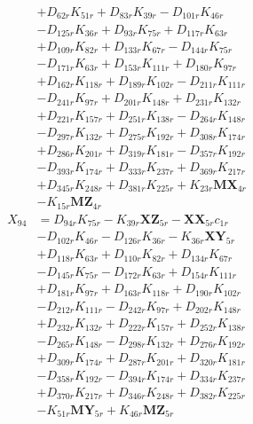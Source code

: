\begin{multicols}{2}
\begin{align}
&+ D_{62r}K_{51r} + D_{83r}K_{39r} - D_{101r}K_{46r}  \nonumber \\
&- D_{125r}K_{36r} + D_{93r}K_{75r} + D_{117r}K_{63r}  \nonumber \\
&+ D_{109r}K_{82r} + D_{133r}K_{67r} - D_{144r}K_{75r}  \nonumber \\
&- D_{171r}K_{63r} + D_{153r}K_{111r} + D_{180r}K_{97r}  \nonumber \\
&+ D_{162r}K_{118r} + D_{189r}K_{102r} - D_{211r}K_{111r}  \nonumber \\
&- D_{241r}K_{97r} + D_{201r}K_{148r} + D_{231r}K_{132r}  \nonumber \\
&+ D_{221r}K_{157r} + D_{251r}K_{138r} - D_{264r}K_{148r}  \nonumber \\
&- D_{297r}K_{132r} + D_{275r}K_{192r} + D_{308r}K_{174r}  \nonumber \\
&+ D_{286r}K_{201r} + D_{319r}K_{181r} - D_{357r}K_{192r}  \nonumber \\
&- D_{393r}K_{174r} + D_{333r}K_{237r} + D_{369r}K_{217r}  \nonumber \\
&+ D_{345r}K_{248r} + D_{381r}K_{225r} + K_{23r}\mathbf{MX}_{4r}  \nonumber \\
&- K_{15r}\mathbf{MZ}_{4r} \nonumber \\
X_{94} &= D_{94r}K_{75r} - K_{39r}\mathbf{XZ}_{5r} - \mathbf{XX}_{5r}c_{1r}  \nonumber \\
&- D_{102r}K_{46r} - D_{126r}K_{36r} - K_{36r}\mathbf{XY}_{5r}  \nonumber \\
&+ D_{118r}K_{63r} + D_{110r}K_{82r} + D_{134r}K_{67r}  \nonumber \\
&- D_{145r}K_{75r} - D_{172r}K_{63r} + D_{154r}K_{111r}  \nonumber \\
&+ D_{181r}K_{97r} + D_{163r}K_{118r} + D_{190r}K_{102r}  \nonumber \\
&- D_{212r}K_{111r} - D_{242r}K_{97r} + D_{202r}K_{148r}  \nonumber \\
&+ D_{232r}K_{132r} + D_{222r}K_{157r} + D_{252r}K_{138r}  \nonumber \\
&- D_{265r}K_{148r} - D_{298r}K_{132r} + D_{276r}K_{192r}  \nonumber \\
&+ D_{309r}K_{174r} + D_{287r}K_{201r} + D_{320r}K_{181r}  \nonumber \\
&- D_{358r}K_{192r} - D_{394r}K_{174r} + D_{334r}K_{237r}  \nonumber \\
&+ D_{370r}K_{217r} + D_{346r}K_{248r} + D_{382r}K_{225r}  \nonumber \\
&- K_{51r}\mathbf{MY}_{5r} + K_{46r}\mathbf{MZ}_{5r} \nonumber \\

\end{align}
\end{multicols}
